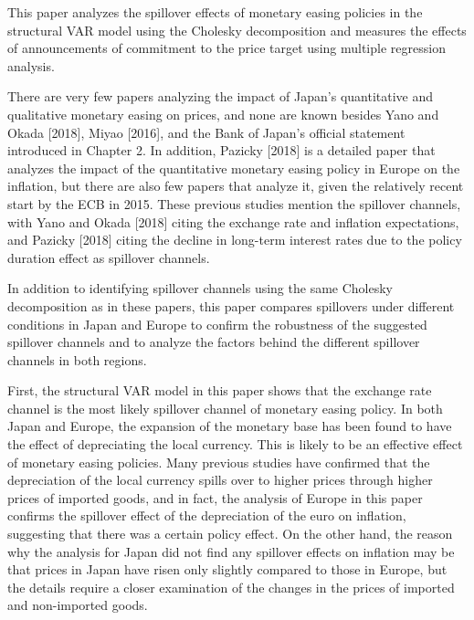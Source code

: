 \documentclass[12pt]{article}
\begin{document}
This paper analyzes the spillover effects of monetary easing policies in the structural VAR model using the Cholesky decomposition and measures the effects of announcements of commitment to the price target using multiple regression analysis.

There are very few papers analyzing the impact of Japan's quantitative and qualitative monetary easing on prices, and none are known besides Yano and Okada [2018], Miyao [2016], and the Bank of Japan's official statement introduced in Chapter 2.
In addition, Pazicky [2018] is a detailed paper that analyzes the impact of the quantitative monetary easing policy in Europe on the inflation, but there are also few papers that analyze it, given the relatively recent start by the ECB in 2015.
These previous studies mention the spillover channels, with Yano and Okada [2018] citing the exchange rate and inflation expectations, and Pazicky [2018] citing the decline in long-term interest rates due to the policy duration effect as spillover channels.

In addition to identifying spillover channels using the same Cholesky decomposition as in these papers, this paper compares spillovers under different conditions in Japan and Europe to confirm the robustness of the suggested spillover channels and to analyze the factors behind the different spillover channels in both regions.

First, the structural VAR model in this paper shows that the exchange rate channel is the most likely spillover channel of monetary easing policy.
In both Japan and Europe, the expansion of the monetary base has been found to have the effect of depreciating the local currency.
This is likely to be an effective effect of monetary easing policies.
Many previous studies have confirmed that the depreciation of the local currency spills over to higher prices through higher prices of imported goods, and in fact, the analysis of Europe in this paper confirms the spillover effect of the depreciation of the euro on inflation, suggesting that there was a certain policy effect.
On the other hand, the reason why the analysis for Japan did not find any spillover effects on inflation may be that prices in Japan have risen only slightly compared to those in Europe, but the details require a closer examination of the changes in the prices of imported and non-imported goods.
\end{document}
